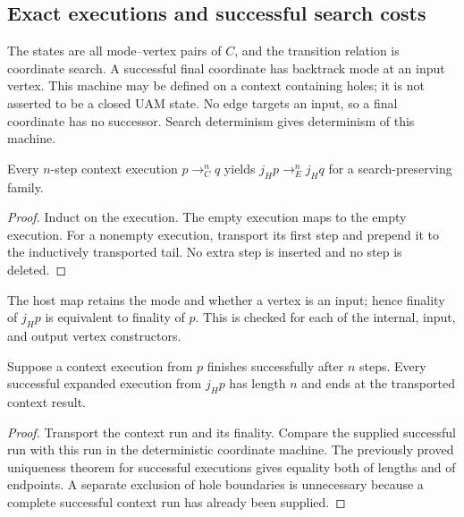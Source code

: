 \subsection{Exact executions and successful search costs}
\begin{definition}\label{term:coordinate-machine}
The states are all mode--vertex pairs of $C$, and the transition relation is
coordinate search. A successful final coordinate has backtrack mode at an input
vertex. This machine may be defined on a context containing holes; it is not
asserted to be a closed UAM state. No edge targets an input, so a final coordinate
has no successor. Search determinism gives determinism of this machine.
\end{definition}
\begin{theorem}
Every $n$-step context execution $p\longrightarrow_C^n q$ yields
$j_Hp\longrightarrow_E^n j_Hq$ for a search-preserving family.
\end{theorem}
\begin{proof}
Induct on the execution. The empty execution maps to the empty execution.
For a nonempty execution, transport its first step and prepend it to the
inductively transported tail. No extra step is inserted and no step is deleted.
\end{proof}
The host map retains the mode and whether a vertex is an input; hence finality
of $j_Hp$ is equivalent to finality of $p$. This is checked for each of the
internal, input, and output vertex constructors.
\begin{theorem}
Suppose a context execution from $p$ finishes successfully after $n$ steps.
Every successful expanded execution from $j_Hp$ has length $n$ and ends at the
transported context result.
\end{theorem}
\begin{proof}
Transport the context run and its finality. Compare the supplied successful run
with this run in the deterministic coordinate machine. The previously proved
uniqueness theorem for successful executions gives equality both of lengths
and of endpoints. A separate exclusion of hole boundaries is unnecessary
because a complete successful context run has already been supplied.
\end{proof}

